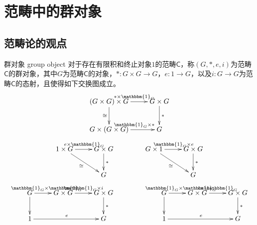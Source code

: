 \section{范畴中的群对象}

\subsection{范畴论的观点}

\begin{definition}{群对象 group object}
	对于存在有限积和终止对象$1$的范畴$\mathsf{C}$，称$(G,*,e, i )$为范畴$\mathsf{C}$的群对象，其中$G$为范畴$\mathsf{C}$的对象，$*:G\times G\to G$，$e:1\to G$，以及$ i :G\to G$为范畴$\mathsf{C}$的态射，且使得如下交换图成立。
	$$
	\xymatrix{
		(G\times G)\times G \ar[r]^{*\times\mathbbm{1}_G} \ar[d]_{\cong} & G\times G \ar[d]^{*}\\
		G\times (G\times G) \ar[r]^{\mathbbm{1}_{G}\times *} & G
	}
	$$
	$$
	\xymatrix{
		1\times G \ar[r]^{e\times \mathbbm{1}_G} \ar[dr]_{\cong} & G\times G \ar[d]^{*}\\
		&G 
	}
	\qquad\qquad
	\xymatrix{
		G\times 1 \ar[r]^{\mathbbm{1}_G\times e} \ar[dr]_{\cong} & G\times G \ar[d]^{*}\\
		&G 
	}
	$$
	$$
	\xymatrix{
		G \ar[r]^{\mathbbm{1}_G\times\mathbbm{1}_G} \ar[d] & G\times G \ar[r]^{\mathbbm{1}_G\times i } & G\times G \ar[d]^{*} \\
		1 \ar[rr]^{e} & & G
	}
	\qquad\qquad
	\xymatrix{
		G \ar[r]^{\mathbbm{1}_G\times\mathbbm{1}_G} \ar[d] & G\times G \ar[r]^{ i \times\mathbbm{1}_G} & G\times G \ar[d]^{*} \\
		1 \ar[rr]^{e} & & G
	}
	$$
\end{definition}

% 
